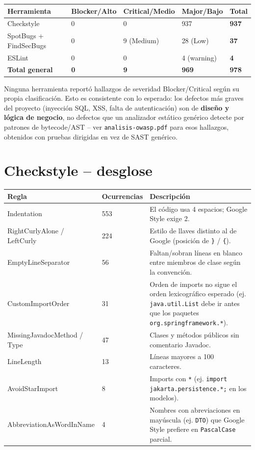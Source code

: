 \documentclass[11pt,a4paper]{article}
\begin{document}
\begin{longtable}{@{}p{3.2cm}p{2.2cm}p{2.2cm}p{2.2cm}p{2.5cm}@{}}
\toprule
\textbf{Herramienta} & \textbf{Blocker/Alto} & \textbf{Critical/Medio} & \textbf{Major/Bajo} & \textbf{Total} \\
\midrule
\endhead
Checkstyle & 0 & 0 & 937 & \textbf{937} \\
SpotBugs + FindSecBugs & 0 & 9 (Medium) & 28 (Low) & \textbf{37} \\
ESLint & 0 & 0 & 4 (warning) & \textbf{4} \\
\midrule
\textbf{Total general} & \textbf{0} & \textbf{9} & \textbf{969} & \textbf{978} \\
\bottomrule
\end{longtable}

Ninguna herramienta report\'o hallazgos de severidad Blocker/Critical seg\'un
su propia clasificaci\'on. Esto es consistente con lo esperado: los defectos
m\'as graves del proyecto (inyecci\'on SQL, XSS, falta de autenticaci\'on) son
de \textbf{dise\~no y l\'ogica de negocio}, no defectos que un analizador
est\'atico gen\'erico detecte por patrones de bytecode/AST -- ver
\texttt{analisis-owasp.pdf} para esos hallazgos, obtenidos con pruebas
dirigidas en vez de SAST gen\'erico.

\section{Checkstyle -- desglose}

\begin{longtable}{@{}p{5cm}p{2cm}p{7cm}@{}}
\toprule
\textbf{Regla} & \textbf{Ocurrencias} & \textbf{Descripci\'on} \\
\midrule
\endhead
Indentation & 553 & El c\'odigo usa 4 espacios; Google Style exige 2. \\
RightCurlyAlone / LeftCurly & 224 & Estilo de llaves distinto al de Google
  (posici\'on de \texttt{\}} / \texttt{\{}). \\
EmptyLineSeparator & 56 & Faltan/sobran l\'ineas en blanco entre miembros de
  clase seg\'un la convenci\'on. \\
CustomImportOrder & 31 & Orden de imports no sigue el orden lexicogr\'afico
  esperado (ej. \texttt{java.util.List} debe ir antes que los paquetes
  \texttt{org.springframework.*}). \\
MissingJavadocMethod / Type & 47 & Clases y m\'etodos p\'ublicos sin
  comentario Javadoc. \\
LineLength & 13 & L\'ineas mayores a 100 caracteres. \\
AvoidStarImport & 8 & Imports con \texttt{*} (ej. \texttt{import
  jakarta.persistence.*;} en los modelos). \\
AbbreviationAsWordInName & 4 & Nombres con abreviaciones en may\'uscula
  (ej. \texttt{DTO}) que Google Style prefiere en \texttt{PascalCase}
  parcial. \\
\bottomrule
\end{longtable}
\end{document}
